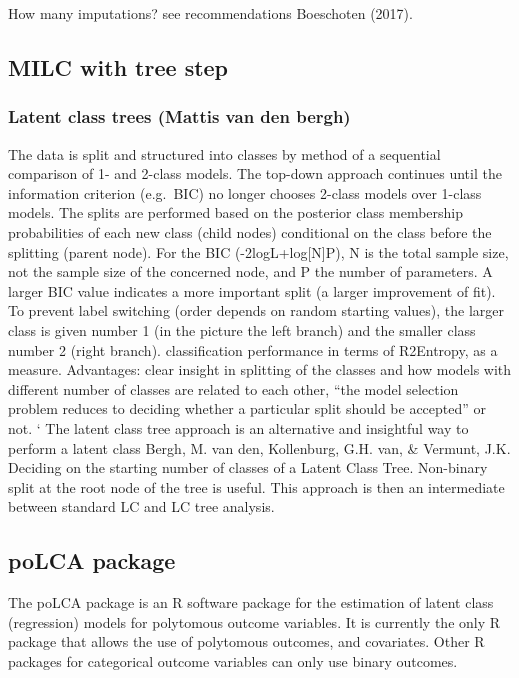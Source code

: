 \documentclass[
]{article}
\begin{document}
How many imputations? see recommendations Boeschoten (2017).

\hypertarget{milc-with-tree-step}{%
\subsection{MILC with tree step}\label{milc-with-tree-step}}

\hypertarget{latent-class-trees-mattis-van-den-bergh}{%
\subsubsection{Latent class trees (Mattis van den
bergh)}\label{latent-class-trees-mattis-van-den-bergh}}

The data is split and structured into classes by method of a sequential
comparison of 1- and 2-class models. The top-down approach continues
until the information criterion (e.g.~BIC) no longer chooses 2-class
models over 1-class models. The splits are performed based on the
posterior class membership probabilities of each new class (child nodes)
conditional on the class before the splitting (parent node). For the BIC
(-2logL+log{[}N{]}P), N is the total sample size, not the sample size of
the concerned node, and P the number of parameters. A larger BIC value
indicates a more important split (a larger improvement of fit). To
prevent label switching (order depends on random starting values), the
larger class is given number 1 (in the picture the left branch) and the
smaller class number 2 (right branch). classification performance in
terms of R2Entropy, as a measure. Advantages: clear insight in splitting
of the classes and how models with different number of classes are
related to each other, ``the model selection problem reduces to deciding
whether a particular split should be accepted'' or not. ` The latent
class tree approach is an alternative and insightful way to perform a
latent class Bergh, M. van den, Kollenburg, G.H. van, \& Vermunt, J.K.
Deciding on the starting number of classes of a Latent Class Tree.
Non-binary split at the root node of the tree is useful. This approach
is then an intermediate between standard LC and LC tree analysis.

\hypertarget{polca-package}{%
\subsection{poLCA package}\label{polca-package}}

The poLCA package is an R software package for the estimation of latent
class (regression) models for polytomous outcome variables. It is
currently the only R package that allows the use of polytomous outcomes,
and covariates. Other R packages for categorical outcome variables can
only use binary outcomes.
\end{document}
